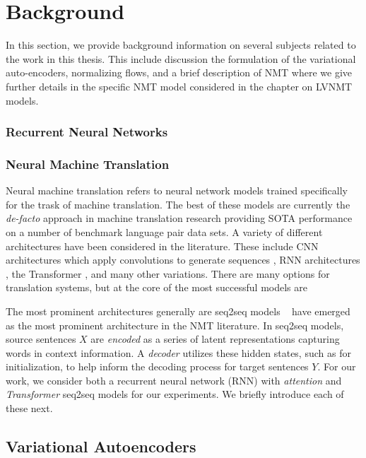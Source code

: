 \chapter{Background}

In this section, we provide background information on several subjects related to the work in this thesis. This include discussion the formulation of the variational auto-encoders, normalizing flows, and a brief description of \ac{NMT} where we give further details in the specific NMT model considered in the chapter on \ac{LVNMT} models.  

\subsection{Recurrent Neural Networks}



\subsection{Neural Machine Translation}

Neural machine translation refers to neural network models trained specifically for the trask of machine translation. The best of these models are currently the \textit{de-facto} approach in machine translation research providing \ac{SOTA} performance on a number of benchmark language pair data sets.
 A variety of different architectures have been considered in the literature. These include CNN architectures which apply convolutions to generate sequences , \ac{RNN} architectures \cite{bahdanau2014NMTBYJoint,cho2014GRU}, the Transformer , and many other variations. There are many options for translation systems, but at the core of the most successful models are 

The most prominent architectures generally are \ac{seq2seq} models ~\cite{koehn2017NMT} have emerged as the most prominent architecture in the NMT literature. In seq2seq models, source sentences $X$ are \textit{encoded} as a series of latent representations capturing words in context information. A \textit{decoder} utilizes these hidden states, such as for initialization, to help inform the decoding process for target sentences $Y$. For our work, we consider both a recurrent neural network (RNN) with \textit{attention} and \textit{Transformer} seq2seq models for our experiments. We briefly introduce each of these next.


\section{Variational Autoencoders}

